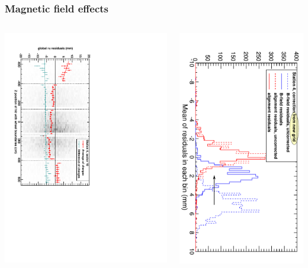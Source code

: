 \documentclass[compress]{beamer}
\begin{document}
\begin{frame}
\frametitle{Magnetic field effects}

\begin{columns}
\includegraphics[height=\linewidth, angle=90]{demo_of_bfield.pdf}

\includegraphics[height=\linewidth, angle=90]{newgrid_corrections_station4.pdf}


\end{columns}
\end{frame}
\end{document}
